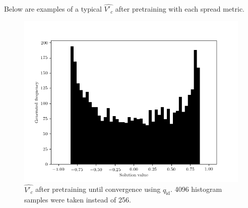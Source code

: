 \documentclass[../../main.tex]{subfiles}
\begin{document}
Below are examples of a typical $\hat{V'_c}$ after pretraining with each spread metric.
\begin{figure}[H]
    \begin{center}
    \includegraphics[width=\textwidth]{identitySpread}
    \caption{
        $\hat{V'_c}$ after pretraining until convergence using $q_\text{id}$.
        4096 histogram samples were taken instead of 256.
    }
    \label{fig:identitySpread}
    \end{center}
\end{figure}
\end{document}
